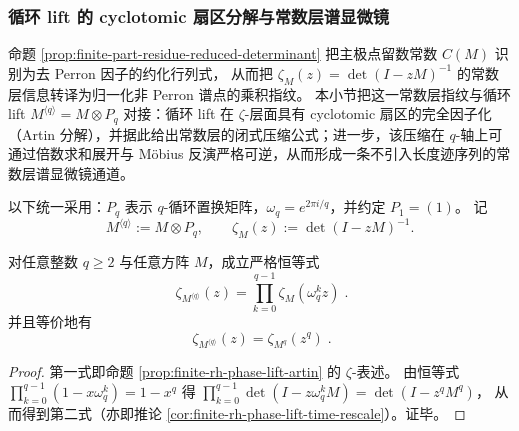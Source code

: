 \subsubsection{循环 lift 的 cyclotomic 扇区分解与常数层谱显微镜}\label{subsec:finite-part-cyclic-lift-cyclotomic-microscope}
命题 \ref{prop:finite-part-residue-reduced-determinant} 把主极点留数常数 \(C(M)\) 识别为去 Perron 因子的约化行列式，
从而把 \(\zeta_M(z)=\det(I-zM)^{-1}\) 的常数层信息转译为归一化非 Perron 谱点的乘积指纹。
本小节把这一常数层指纹与循环 lift \(M^{\langle q\rangle}=M\otimes P_q\) 对接：循环 lift 在 \(\zeta\)-层面具有 cyclotomic 扇区的完全因子化（Artin 分解），并据此给出常数层的闭式压缩公式；进一步，该压缩在 \(q\)-轴上可通过倍数求和展开与 Möbius 反演严格可逆，从而形成一条不引入长度迹序列的常数层谱显微镜通道。
\par
以下统一采用：\(P_q\) 表示 \(q\)-循环置换矩阵，\(\omega_q=e^{2\pi i/q}\)，并约定 \(P_1=(1)\)。
记
\[
M^{\langle q\rangle}:=M\otimes P_q,\qquad
\zeta_M(z):=\det(I-zM)^{-1}.
\]

\begin{proposition}\label{prop:finite-part-cyclic-lift-cyclotomic-sector}
对任意整数 \(q\ge 2\) 与任意方阵 \(M\)，成立严格恒等式
\[
\boxed{\;
\zeta_{M^{\langle q\rangle}}(z)=\prod_{k=0}^{q-1}\zeta_M(\omega_q^{k}z)\; }.
\]
并且等价地有
\[
\boxed{\;
\zeta_{M^{\langle q\rangle}}(z)=\zeta_{M^{q}}(z^{q})\; }.
\]
\end{proposition}
\begin{proof}
第一式即命题 \ref{prop:finite-rh-phase-lift-artin} 的 \(\zeta\)-表述。
由恒等式 \(\prod_{k=0}^{q-1}(1-x\omega_q^k)=1-x^q\) 得
\(
\prod_{k=0}^{q-1}\det(I-z\omega_q^kM)=\det(I-z^qM^q)
\)，
从而得到第二式（亦即推论 \ref{cor:finite-rh-phase-lift-time-rescale}）。证毕。
\end{proof}

